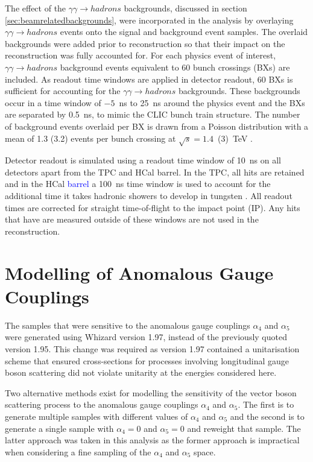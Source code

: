 The effect of the $\gamma\gamma \rightarrow hadrons$ backgrounds, discussed in section \ref{sec:beamrelatedbackgrounds}, were incorporated in the analysis by overlaying $\gamma\gamma \rightarrow hadrons$ events onto the signal and background event samples.  The overlaid backgrounds were added prior to reconstruction so that their impact on the reconstruction was fully accounted for.  For each physics event of interest, $\gamma\gamma \rightarrow hadrons$ background events equivalent to 60 bunch crossings (BXs) are included.  As readout time windows are applied in detector readout, 60 BXs is sufficient for accounting for the $\gamma\gamma \rightarrow hadrons$ backgrounds.  These backgrounds occur in a time window of $-5$~ns to 25~ns around the physics event and the BXs are separated by 0.5~ns, to mimic the CLIC bunch train structure.  The number of background events overlaid per BX is drawn from a Poisson distribution with a mean of 1.3 (3.2) events per bunch crossing at $\sqrt{s}=1.4$~(3)~TeV \cite{Linssen:2012hp}.  

Detector readout is simulated using a readout time window of 10~ns on all detectors apart from the TPC and HCal barrel.  In the TPC, all hits are retained and in the HCal \textcolor{blue}{barrel} a 100~ns time window is used to account for the additional time it takes hadronic showers to develop in tungsten \cite{Linssen:2012hp}.  All readout times are corrected for straight time-of-flight to the impact point (IP).  Any hits that have are measured outside of these windows are not used in the reconstruction.   
 

\section{Modelling of Anomalous Gauge Couplings}
\label{sec:modellingofanomalouscouplings}
The samples that were sensitive to the anomalous gauge couplings $\alpha_{4}$ and $\alpha_{5}$ were generated using Whizard version 1.97, instead of the previously quoted version 1.95.  This change was required as version 1.97 contained a unitarisation scheme that ensured cross-sections for processes involving longitudinal gauge boson scattering did not violate unitarity at the energies considered here.  

Two alternative methods exist for modelling the sensitivity of the vector boson scattering process to the anomalous gauge couplings $\alpha_{4}$ and $\alpha_{5}$.  The first is to generate multiple samples with different values of $\alpha_{4}$ and $\alpha_{5}$ and the second is to generate a single sample with $\alpha_{4} = 0$ and $\alpha_{5} = 0$ and reweight that sample.  The latter approach was taken in this analysis as the former approach is impractical when considering a fine sampling of the $\alpha_{4}$ and $\alpha_{5}$ space.

